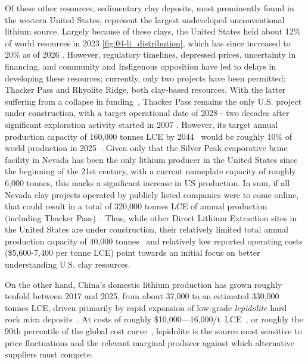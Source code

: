 Of these other resources, sedimentary clay deposits, most prominently found in the western United States, represent the largest undeveloped unconventional lithium source. Largely because of these clays, the United States held about 12\% of world resources in 2023 \ref{fig:04-li_distribution}, which has since increased to 20\% as of 2026 \cite{usgeologicalsurveyMineralCommoditySummaries2026}. However, regulatory timelines, depressed prices, uncertainty in financing, and community and Indigenous opposition have led to delays in developing these resources; currently, only two projects have been permitted: Thacker Pass and Rhyolite Ridge, both clay-based resources. With the latter suffering from a collapse in funding~\cite{haasRhyoliteRidgeLithium2025}, Thacker Pass remains the only U.S. project under construction, with a target operational date of 2028 - two decades after significant exploration activity started in 2007 \cite{alonzoEvenLithiumPrices2025, NolanTestimony2025, calaway2025AnnualReport2025}. However, its target annual production capacity of 160,000 tonnes LCE by 2044~\cite{sgscanadaincSK1300Technical2024} would be roughly 10\% of world production in 2025~\cite{usgeologicalsurveyMineralCommoditySummaries2026}. Given only that the Silver Peak evaporative brine facility in Nevada has been the only lithium producer in the United States since the beginning of the 21st century, with a current nameplate capacity of roughly 6,000 tonnes, this marks a significant increase in US production. In sum, if all Nevada clay projects operated by publicly listed companies were to come online, that could result in a total of 320,000 tonnes LCE of annual production (including Thacker Pass)~\cite{sgscanadaincSK1300Technical2024, fluorenterprisesRhyoliteRidgeLithiumBoron2022, dyerAmendedResourceEstimate, laneNI43101Technical2024, riordanTonopahLithiumClaims2023, samariMineralResourceEstimate2024}. Thus, while other Direct Lithium Extraction sites in the United States are under construction, their relatively limited total annual production capacity of 40,000 tonnes~\cite{worleyltdParadoxLithiumProject, gallardoSouthWestArkansas2025, brushNi43101Technical2023} and relatively low reported operating costs (\$5,600-7,400 per tonne LCE) point towards an initial focus on better understanding U.S. clay resources. 

On the other hand, China's domestic lithium production has grown roughly tenfold between 2017 and 2025, from about 37,000 to an estimated 330,000 tonnes LCE, driven primarily by rapid expansion of low-grade \textit{lepidolite} hard rock mica deposits~\cite{benchmarkteamRestartCATLsJianxiawo2026, usgeologicalsurveyMineralCommoditySummaries2026}. At costs of roughly \$10,000---16,000/t~LCE~\cite{liuChinaLithiumBoom2024, atkinsonLithiumPriceReversion2023, jamasmieCATLCutLithium2024}, or roughly the 90th percentile of the global cost curve~\cite{sulcaLithiumPricesWhere2024}, lepidolite is the source most sensitive to price fluctuations and the relevant marginal producer against which alternative suppliers must compete.


